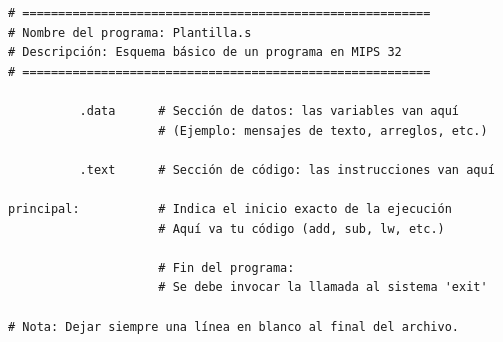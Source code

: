 \documentclass[12pt,a4paper]{article}
\begin{document}
\begin{verbatim}
# =========================================================
# Nombre del programa: Plantilla.s
# Descripción: Esquema básico de un programa en MIPS 32
# =========================================================

          .data      # Sección de datos: las variables van aquí
                     # (Ejemplo: mensajes de texto, arreglos, etc.)
                     
          .text      # Sección de código: las instrucciones van aquí
          
principal:           # Indica el inicio exacto de la ejecución 
                     # Aquí va tu código (add, sub, lw, etc.)
                     
                     # Fin del programa:
                     # Se debe invocar la llamada al sistema 'exit'
                     
# Nota: Dejar siempre una línea en blanco al final del archivo.
\end{verbatim}
\end{document}
